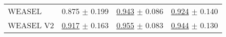 \begin{tabular}{llll}
WEASEL & \textcolor[rgb]{0.1380753138,0.5000000000,0}{0.875} $\pm$ \textcolor[rgb]{0.7390823473,0.2609176527,0}{0.199} & \underline{\textcolor[rgb]{0.1706161137,0.5000000000,0}{0.943}} $\pm$ \textcolor[rgb]{0.2209016468,0.5000000000,0}{0.086} & \underline{\textcolor[rgb]{0.1944444444,0.5000000000,0}{0.924}} $\pm$ \textcolor[rgb]{0.4049258024,0.5000000000,0}{0.140} \\
WEASEL V2 & \underline{\textcolor[rgb]{0.0460251046,0.5000000000,0}{0.917}} $\pm$ \textcolor[rgb]{0.5577723962,0.4422276038,0}{0.163} & \underline{\textcolor[rgb]{0.0995260664,0.5000000000,0}{0.955}} $\pm$ \textcolor[rgb]{0.1853514393,0.5000000000,0}{0.083} & \underline{\textcolor[rgb]{0.1111111111,0.5000000000,0}{0.944}} $\pm$ \textcolor[rgb]{0.3121982484,0.5000000000,0}{0.130} \\
\bottomrule
\end{tabular}

